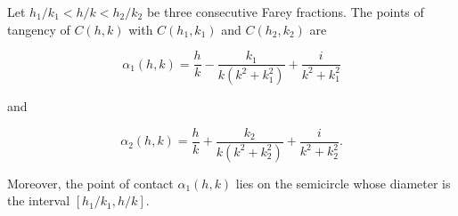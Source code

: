 Let $h_1/k_1 < h/k < h_2/k_2$ be three consecutive Farey fractions. The points of tangency of $C(h, k)$ with $C(h_1, k_1)$ and $C(h_2, k_2)$ are

$$\alpha_1(h, k) = \frac{h}{k} - \frac{k_1}{k(k^2 + k_1^2)} + \frac{i}{k^2 + k_1^2}$$

and

$$\alpha_2(h, k) = \frac{h}{k} + \frac{k_2}{k(k^2 + k_2^2)} + \frac{i}{k^2 + k_2^2}.$$

Moreover, the point of contact $\alpha_1(h, k)$ lies on the semicircle whose diameter is the interval $[h_1/k_1, h/k]$.
